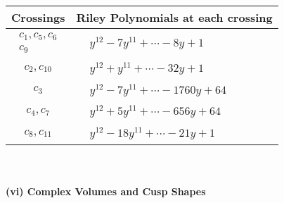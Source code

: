 \documentclass[1p]{elsarticle_modified}
\theoremstyle{definition}
\begin{document}
\begin{tabular}{m{50pt}|m{274pt}}
Crossings & \hspace{64pt}Riley Polynomials at each crossing \\
\hline $$\begin{aligned}c_{1},c_{5},c_{6}\\c_{9}\end{aligned}$$&$\begin{aligned}
&y^{12}-7 y^{11}+\cdots-8 y+1
\end{aligned}$\\
\hline $$\begin{aligned}c_{2},c_{10}\end{aligned}$$&$\begin{aligned}
&y^{12}+y^{11}+\cdots-32 y+1
\end{aligned}$\\
\hline $$\begin{aligned}c_{3}\end{aligned}$$&$\begin{aligned}
&y^{12}-7 y^{11}+\cdots-1760 y+64
\end{aligned}$\\
\hline $$\begin{aligned}c_{4},c_{7}\end{aligned}$$&$\begin{aligned}
&y^{12}+5 y^{11}+\cdots-656 y+64
\end{aligned}$\\
\hline $$\begin{aligned}c_{8},c_{11}\end{aligned}$$&$\begin{aligned}
&y^{12}-18 y^{11}+\cdots-21 y+1
\end{aligned}$\\
\hline
\end{tabular}\\~\\
\newpage\flushleft \textbf{(vi) Complex Volumes and Cusp Shapes}
\end{document}
